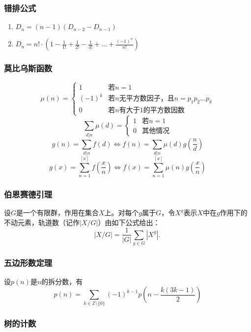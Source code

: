 \documentclass[a4paper]{article}
\begin{document}
\subsubsection{错排公式}

\begin{enumerate}
	\item $D_n = (n-1)(D_{n-2}-D_{n-1})$
	\item $D_n = n! \cdot (1-\frac{1}{1!}+\frac{1}{2!}-\frac{1}{3!}+\ldots+\frac{(-1)^n}{n!})$
\end{enumerate}

\subsubsection{莫比乌斯函数}

$$\mu(n) = \begin{cases}
1 & \text{若}n=1\\
(-1)^k & \text{若}n\text{无平方数因子，且}n = p_1p_2\dots p_k\\
0 & \text{若}n\text{有大于}1\text{的平方数因数}
\end{cases}$$
$$\sum_{d|n}{\mu(d)} = \begin{cases}
1 & \text{若}n=1\\
0 & \text{其他情况}
\end{cases}$$
$$g(n) = \sum_{d|n}{f(d)} \Leftrightarrow f(n) = \sum_{d|n}{\mu(d)g(\frac{n}{d})}$$
$$g(x) = \sum_{n=1}^{[x]}f(\frac{x}{n}) \Leftrightarrow f(x) = \sum_{n=1}^{[x]}{\mu(n)g(\frac{x}{n})}$$

\subsubsection{伯恩赛德引理}
设$G$是一个有限群，作用在集合$X$上。对每个$g$属于$G$，令$X^g$表示$X$中在$g$作用下的不动元素，轨道数（记作$|X/G|$）由如下公式给出：
$$|X/G| = \frac{1}{|G|}\sum_{g \in G}|X^g|.\,$$

\subsubsection{五边形数定理}

设$p(n)$是$n$的拆分数，有$$p(n) = \sum_{k \in \mathbb{Z} \setminus \{0\}} (-1)^{k - 1} p\left(n - \frac{k(3k - 1)}{2}\right)$$

\subsubsection{树的计数}
\end{document}

